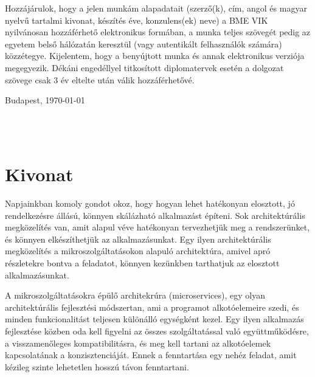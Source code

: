 \documentclass[11pt,magyar,a4paper,twoside,]{report}
\begin{document}
Hozzájárulok, hogy a jelen munkám alapadatait (szerző(k), cím, angol és magyar nyelvű tartalmi kivonat, készítés éve, konzulens(ek) neve) a BME VIK nyilvánosan hozzáférhető elektronikus formában, a munka teljes szövegét pedig az egyetem belső hálózatán keresztül (vagy autentikált felhasználók számára) közzétegye. Kijelentem, hogy a benyújtott munka és annak elektronikus verziója megegyezik. Dékáni engedéllyel titkosított diplomatervek esetén a dolgozat szövege csak 3 év eltelte után válik hozzáférhetővé.

\begin{flushleft}
\vspace*{1cm}
Budapest, \today
\end{flushleft}

\begin{flushright}
 \vspace*{1cm}
 \makebox[7cm]{\rule{6cm}{.4pt}}\\
 \\
\end{flushright}
\thispagestyle{empty}

\vfill
\clearpage
\thispagestyle{empty} %

\chapter*{Kivonat}\label{kivonat}

Napjainkban komoly gondot okoz, hogy hogyan lehet hatékonyan elosztott,
jó rendelkezésre állású, könnyen skálázható alkalmazást építeni. Sok
architektúrális megközelítés van, amit alapul véve hatékonyan
tervezhetjük meg a rendszerünket, és könnyen elkészíthetjük az
alkalmazásunkat. Egy ilyen architektúrális megközelítés a
mikroszolgáltatásokon alapuló architektúra, amivel apró részletekre
bontva a feladatot, könnyen kezünkben tarthatjuk az elosztott
alkalmazásunkat.

A mikroszolgáltatásokra épülő architekrúra (microservices), egy olyan
architektúrális fejlesztési módszertan, ami a programot alkotóelemeire
szedi, és minden funkcionalitást teljesen különálló egységként kezel.
Egy ilyen alkalmazás fejlesztése közben oda kell figyelni az összes
szolgáltatással való együttműködésre, a visszamenőleges
kompatibilitásra, és meg kell tartani az alkotóelemek kapcsolatának a
konzisztenciáját. Ennek a fenntartása egy nehéz feladat, amit kézileg
szinte lehetetlen hosszú távon fenntartani.
\end{document}
